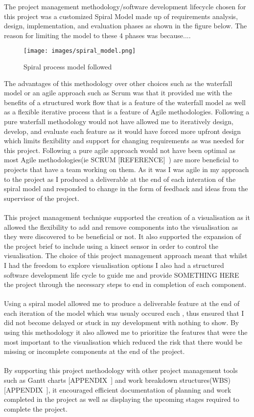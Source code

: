 The project management methodology/software development lifecycle chosen for this project was a customized Spiral Model made up of requirements analysis, design, implementation, and evaluation phases as shown in the figure below. The reason for limiting the model to these 4 phases was because.... ~
\begin{figure}[h!]
  \centering
      \texttt{[image: images/spiral\_model.png]}
  \caption{Spiral process model followed}
\end{figure}
The advantages of this methodology over other choices such as the waterfall model or an agile approach such as Scrum was that it provided me with the benefits of a structured work flow that is a feature of the waterfall model as well as a flexible iterative process that is a feature of Agile methodologies. Following a pure waterfall methodology would not have allowed me to iteratively design, develop, and evaluate each feature as it would have forced more upfront design which limits flexibility and support for changing requirements as was needed for this project. Following a pure agile approach would not have been optimal as most Agile methodologies(ie SCRUM [REFERENCE]~) are more beneficial to projects that have a team working on them. As it was I was agile in my approach to the project as I produced a deliverable at the end of each interation of the spiral model and responded to change in the form of feedback and ideas from the supervisor of the project.
\\\\
This project management technique supported the creation of a visualisation as it allowed the flexibility to add and remove components into the visualisation as they were discovered to be beneficial or not. It also supported the expansion of the project brief to include using a kinect sensor in order to control the visualisation. The choice of this project management approach meant that whilst I had the freedom to explore visualisation options I also had a structured software development life cycle to guide me and provide SOMETHING HERE~ the project through the necessary steps to end in completion of each component.
\\\\
Using a spiral model allowed me to produce a deliverable feature at the end of each iteration of the model which was usualy occured each , thus ensured that I did not become delayed or stuck in my development with nothing to show. By using this methodology it also allowed me to prioritize the features that were the most important to the visualisation which reduced the risk that there would be missing or incomplete components at the end of the project. 
\\\\
By supporting this project methodology with other project management tools such as Gantt charts [APPENDIX~] and work breakdown structures(WBS) [APPENDIX~], it encouraged efficient documentation of planning and work completed in the project as well as displaying the upcoming stages required to complete the project.
\\\\

